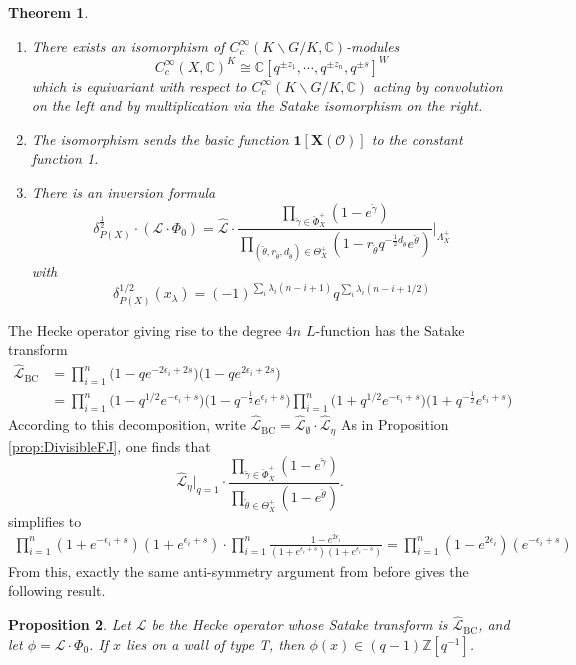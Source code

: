 \documentclass{amsart}
\newtheorem{theorem}{Theorem}[section]
\newtheorem{prop}[theorem]{Proposition}
\theoremstyle{definition}
\theoremstyle{remark}
\newcommand{\1}{\mathbf{1}}
\newcommand{\C}{\mathbb{C}}
\newcommand{\mb}[1]{\mathbf{#1}}
\newcommand{\Or}{\mathcal{O}}
\newcommand{\sh}[1]{\mathcal{#1}}
\newcommand{\Z}{\mathbb{Z}}
\theoremstyle{definition}
\newcommand{\indf}{\mathbf{1}}
\begin{document}
\begin{theorem}\label{thm:Satake non-split FJ}
\begin{enumerate}
    \item There exists an isomorphism of $C_c^\infty(K\backslash G/K,\C)$-modules 
\[
    C_c^\infty(X,\C)^K\cong \C[q^{\pm z_1},\cdots, q^{\pm z_n},q^{\pm s}]^W
\]
which is equivariant with respect to $C_c^\infty(K\backslash G/K,\C)$ acting by convolution on the left and by multiplication via the Satake isomorphism on the right.
    \item The isomorphism sends the basic function $\indf[\mb{X}(\Or)]$ to the constant function 1.
    \item There is an inversion formula
  \[
        \delta_{P(X)}^{\frac{1}{2}}\cdot(\sh{L}\cdot\Phi_0) = \hat{\sh{L}}\cdot\frac{\prod_{\check{\gamma}\in\check{\Phi}_X^+}(1-e^{\check{\gamma}})}{\prod_{(\check{\theta},r_{\check{\theta}}, d_{\check\theta})\in\Theta_X^+}(1-r_{\check{\theta}}q^{-\frac{1}{2}d_{\check{\theta}}}e^{\check{\theta}})}\bigg|_{\Lambda_X^+}
    \]
with \[\delta_{P(X)}^{1/2}(x_\lambda)=
    (-1)^{\sum_i \lambda_i(n-i+1)}q^{\sum_i \lambda_i(n-i+1/2)}\]
\end{enumerate}
\end{theorem}


The Hecke operator giving rise to the degree $4n$ $L$-function has the Satake transform
\begin{align*}
  \hat{\sh{L}}_{\mathrm{BC}}&=\prod_{i=1}^n\Big(1-qe^{-2\epsilon_i+2s}\Big)\Big(1-qe^{2\epsilon_i+2s}\Big)\\
  &=\prod_{i=1}^n\Big(1-q^{1/2}e^{-\epsilon_i+s}\Big)\Big(1-q^{-\frac{1}{2}}e^{\epsilon_i+s}\Big)\prod_{i=1}^n\Big(1+q^{1/2}e^{-\epsilon_i+s}\Big)\Big(1+q^{-\frac{1}{2}}e^{\epsilon_i+s}\Big)
\end{align*}
According to this decomposition, write $\hat{\sh{L}}_{\mathrm{BC}}=\hat{\sh{L}}_\emptyset\cdot\hat{\sh{L}}_\eta$
As in Proposition \ref{prop:DivisibleFJ}, one finds that  \[
    \hat{\sh{L}}_\eta|_{q=1}\cdot\frac{\prod_{\check{\gamma}\in\check{\Phi}_X^+}(1-e^{\check{\gamma}})}{\prod_{\check{\theta}\in\Theta_X^+}(1-e^{\check{\theta}})}.
  \] simplifies to  \begin{align*}
    \prod_{i=1}^n(1+e^{-\epsilon_i+s})(1+e^{\epsilon_i+s})\cdot\prod_{i=1}^n\frac{1-e^{2\epsilon_i}}{(1+e^{\epsilon_i+s})(1+e^{\epsilon_i-s})}
    =\prod_{i=1}^n(1-e^{2\epsilon_i})(e^{-\epsilon_i+s})
  \end{align*}
  From this, exactly the same anti-symmetry argument from before gives the following result.
  \begin{prop}\label{prop:Divisible non-split FJ}
  Let $\sh{L}$ be the Hecke operator whose Satake transform is $\hat{\sh{L}}_{\mathrm{BC}}$, and let $\phi=\sh{L}\cdot\Phi_0$. If $x$ lies on a wall of type T, then $\phi(x)\in (q-1)\Z[q^{-1}]$.
\end{prop}
\end{document}
